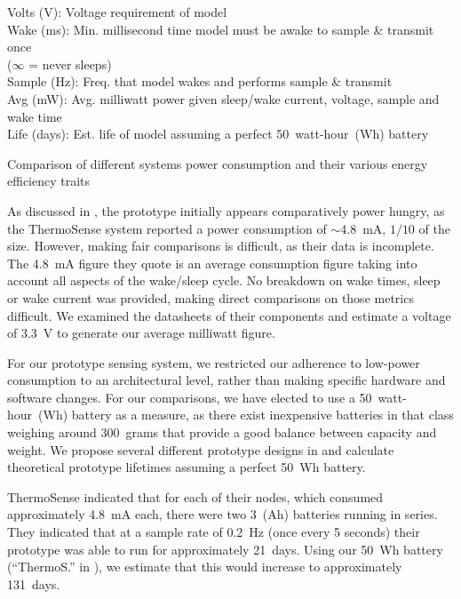 \documentclass[../thesis/thesis.tex]{subfiles}
\begin{document}
\begin{table}
{{\begin{tabbing}
Volts (V): \> Voltage requirement of model\\
Wake (ms): \> Min. millisecond time model must be awake to sample \& transmit once\\
           \> ($\infty$ = never sleeps)\\
Sample (Hz): \> Freq. that model wakes and performs sample \& transmit\\
Avg (mW): \> Avg. milliwatt power given sleep/wake current, voltage, sample and wake time\\
Life (days): \> Est. life of model assuming a perfect 50~watt-hour~(Wh) battery
\end{tabbing}}}
\vspace*{-20px}
\caption{Comparison of different systems power consumption and their various energy efficiency traits}
\label{tab:lives}
\end{table}

As discussed in , the prototype initially appears comparatively power hungry, as the ThermoSense system reported a power consumption of $\sim$4.8~mA, $1/10$ of the size. However, making fair comparisons is difficult, as their data is incomplete. The 4.8~mA figure they quote is an average consumption figure taking into account all aspects of the wake/sleep cycle. No breakdown on wake times, sleep or wake current was provided, making direct comparisons on those metrics difficult. We examined the datasheets of their components and estimate a voltage of 3.3~V to generate our average milliwatt figure.

For our prototype sensing system, we restricted our adherence to low-power consumption to an architectural level, rather than making specific hardware and software changes. For our comparisons, we have elected to use a 50~watt-hour~(Wh) battery as a measure, as there exist inexpensive batteries in that class weighing around 300~grams \cite{AdafruitBattery} that provide a good balance between capacity and weight. We propose several different prototype designs in  and calculate theoretical prototype lifetimes assuming a perfect 50~Wh battery.

ThermoSense indicated that for each of their nodes, which consumed approximately 4.8~mA each, there were two 3~(Ah) batteries running in series. They indicated that at a sample rate of 0.2~Hz (once every 5 seconds) their prototype was able to run for approximately 21~days. Using our 50~Wh battery (``ThermoS.'' in ), we estimate that this would increase to approximately 131~days.
\end{document}

